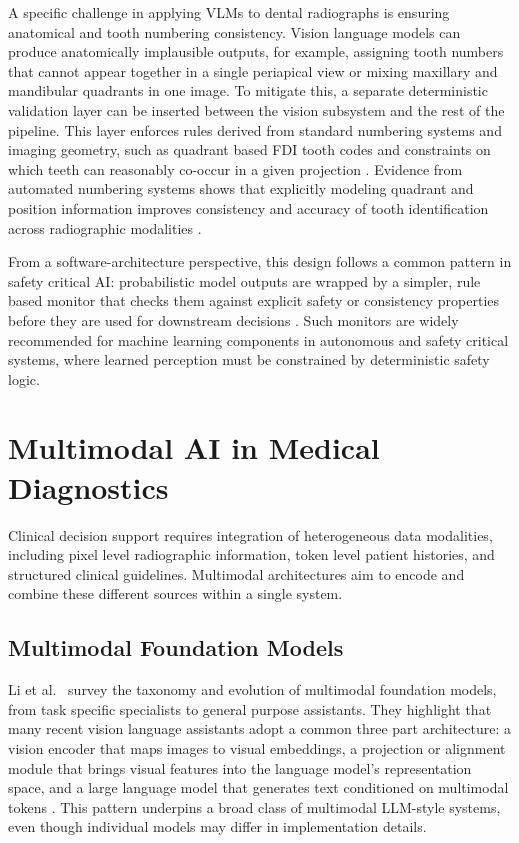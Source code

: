 \documentclass[12pt,a4paper]{report}
\begin{document}
	A specific challenge in applying VLMs to dental radiographs is ensuring anatomical and
	tooth numbering consistency. Vision language models can produce anatomically implausible
	outputs, for example, assigning tooth numbers that cannot appear together in a single
	periapical view or mixing maxillary and mandibular quadrants in one image. To mitigate
	this, a separate deterministic validation layer can be inserted between the vision
	subsystem and the rest of the pipeline. This layer enforces rules derived from standard
	numbering systems and imaging geometry, such as quadrant based FDI tooth codes and
	constraints on which teeth can reasonably co-occur in a given projection
	\cite{integrated_tooth_numbering_fdi}. Evidence from automated numbering systems shows
	that explicitly modeling quadrant and position information improves consistency and
	accuracy of tooth identification across radiographic modalities \cite{integrated_tooth_numbering_fdi}.
	
	From a software-architecture perspective, this design follows a common pattern in
	safety critical AI: probabilistic model outputs are wrapped by a simpler, rule based
	monitor that checks them against explicit safety or consistency properties before they
	are used for downstream decisions \cite{safety_monitor_ml_perception,amlas_safety_assurance}. 
	Such monitors are widely recommended for machine learning components in autonomous and
	safety critical systems, where learned perception must be constrained by deterministic
	safety logic.
	
	
	
	\section{Multimodal AI in Medical Diagnostics}
	\label{sec:multimodal}
	
	Clinical decision support requires integration of heterogeneous data modalities,
	including pixel level radiographic information, token level patient histories,
	and structured clinical guidelines. Multimodal architectures aim to encode and
	combine these different sources within a single system.
	
	\subsection{Multimodal Foundation Models}
	
	Li et al.~\cite{Li2023MultimodalFoundationModels} survey the taxonomy and
	evolution of multimodal foundation models, from task specific specialists to
	general purpose assistants. They highlight that many recent vision language
	assistants adopt a common three part architecture: a vision encoder that maps
	images to visual embeddings, a projection or alignment module that brings visual
	features into the language model's representation space, and a large language
	model that generates text conditioned on multimodal tokens
	\cite{Li2023MultimodalFoundationModels}. This pattern underpins a broad class of
	multimodal LLM-style systems, even though individual models may differ in
	implementation details.
	
\end{document}
